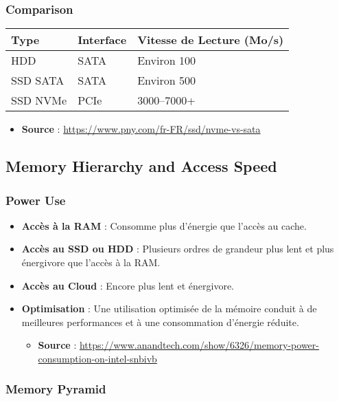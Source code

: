 \documentclass[10pt,a4paper]{article}
\begin{document}
\subsubsection*{Comparison}

\begin{center}
\begin{tabular}{|l|l|l|}
\hline
\textbf{Type} & \textbf{Interface} & \textbf{Vitesse de Lecture (Mo/s)} \\
\hline
HDD & SATA & Environ 100 \\
\hline
SSD SATA & SATA & Environ 500 \\
\hline
SSD NVMe & PCIe & 3000–7000+ \\
\hline
\end{tabular}
\end{center}

\begin{itemize}
    \item \textbf{Source} : \url{https://www.pny.com/fr-FR/ssd/nvme-vs-sata}
\end{itemize}

\subsection*{Memory Hierarchy and Access Speed}

\subsubsection*{Power Use}
\begin{itemize}
    \item \textbf{Accès à la RAM} : Consomme plus d'énergie que l'accès au cache.
    \item \textbf{Accès au SSD ou HDD} : Plusieurs ordres de grandeur plus lent et plus énergivore que l'accès à la RAM.
    \item \textbf{Accès au Cloud} : Encore plus lent et énergivore.
    \item \textbf{Optimisation} : Une utilisation optimisée de la mémoire conduit à de meilleures performances et à une consommation d'énergie réduite.
    \begin{itemize}
        \item \textbf{Source} : \url{https://www.anandtech.com/show/6326/memory-power-consumption-on-intel-snbivb}
    \end{itemize}
\end{itemize}

\subsubsection*{Memory Pyramid}
\end{document}
